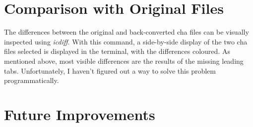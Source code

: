 \section{Comparison with Original Files}
The differences between the original and back-converted cha files can be visually inspected using \emph{icdiff}. With this command, a side-by-side display of the two cha files selected is displayed in the terminal, with the differences coloured. As mentioned above, most visible differences are the results of the missing leading tabs. Unfortunately, I haven't figured out a way to solve this problem programmatically.





\section{Future Improvements}
